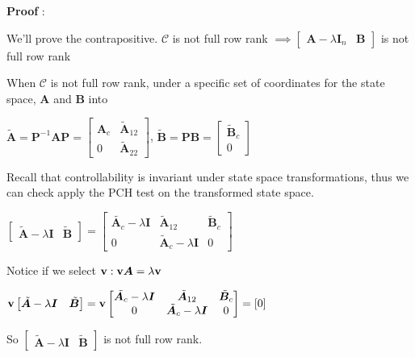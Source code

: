 \documentclass[11pt]{article}
\begin{document}
  \vspace{12pt}
  \textbf{Proof} \impliedby:

  We'll prove the contrapositive. \(\mathcal{C}\) is not full row rank
  \(\implies \begin{bmatrix} \bm{A} - \lambda\bm{I}_n & \bm{B} \end{bmatrix}\) is not full row rank

  When \(\mathcal{C}\) is not full row rank, under a specific set of coordinates for the state space,
  \(\bm{A}\) and \(\bm{B}\) into

  \(\tilde{\bm{A}} = \bm{P}^{-1}\bm{A}\bm{P} =
  \begin{bmatrix}
    \bm{A}_{c} & \tilde{\bm{A}}_{12} \\
    0 & \tilde{\bm{A}}_{22}
  \end{bmatrix}\),
  \(\tilde{\bm{B}} = \bm{P}\bm{B} =
  \begin{bmatrix}
    \tilde{\bm{B}}_c \\
    0
  \end{bmatrix}\)

  Recall that controllability is invariant under state space transformations, thus we can check
  apply the PCH test on the transformed state space.

  \(\begin{bmatrix} \tilde{\bm{A}} - \lambda\bm{I} & \tilde{\bm{B}} \end{bmatrix} =
  \begin{bmatrix}
    \tilde{\bm{A}_c} - \lambda\bm{I} & \tilde{\bm{A}}_{12} & \tilde{\bm{B}}_c \\
    0 & \tilde{\bm{A}}_c - \lambda\bm{I} & 0
  \end{bmatrix}\)

  Notice if we select \(\mathbf{v} : \mathbf{v}\bm{A} = \lambda\mathbf{v}\)

  \(\mathbf{v}\begin{bmatrix} \tilde{\bm{A}} - \lambda\bm{I} & \tilde{\bm{B}} \end{bmatrix} =
  \mathbf{v}\begin{bmatrix}
    \tilde{\bm{A}_c} - \lambda\bm{I} & \tilde{\bm{A}}_{12} & \tilde{\bm{B}}_c \\
    0 & \tilde{\bm{A}}_c - \lambda\bm{I} & 0
  \end{bmatrix} = [0]\)

  So \(\begin{bmatrix} \tilde{\bm{A}} - \lambda\bm{I} & \tilde{\bm{B}} \end{bmatrix}\) is not full row rank.
\end{document}

